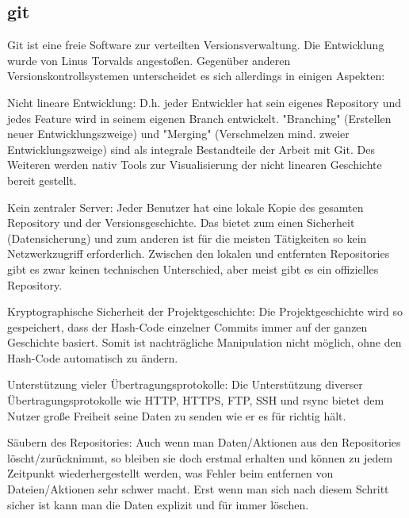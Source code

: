 \subsection{git}
Git ist eine freie Software zur verteilten Versionsverwaltung. Die Entwicklung wurde von Linus Torvalds angestoßen. Gegenüber anderen Versionskontrollsystemen unterscheidet es sich allerdings in einigen Aspekten:

\noindent Nicht lineare Entwicklung:
D.h. jeder Entwickler hat sein eigenes Repository und jedes Feature wird in seinem eigenen Branch entwickelt. "Branching" (Erstellen neuer Entwicklungszweige) und "Merging" (Verschmelzen mind. zweier Entwicklungszweige) sind als integrale Bestandteile der Arbeit mit Git. Des Weiteren werden nativ Tools zur Visualisierung der nicht linearen Geschichte bereit gestellt.

\noindent Kein zentraler Server:
Jeder Benutzer hat eine lokale Kopie des gesamten Repository und der Versionsgeschichte. Das bietet zum einen Sicherheit (Datensicherung) und zum anderen ist für die meisten Tätigkeiten so kein Netzwerkzugriff erforderlich. Zwischen den lokalen und entfernten Repositories gibt es zwar keinen technischen Unterschied, aber meist gibt es ein offizielles Repository.

\noindent Kryptographische Sicherheit der Projektgeschichte:
Die Projektgeschichte wird so gespeichert, dass der Hash-Code einzelner Commits immer auf der ganzen Geschichte basiert. Somit ist nachträgliche Manipulation nicht möglich, ohne den Hash-Code automatisch zu ändern.

\noindent Unterstützung vieler Übertragungsprotokolle:
Die Unterstützung diverser Übertragungsprotokolle wie HTTP, HTTPS, FTP, SSH und rsync bietet dem Nutzer große Freiheit seine Daten zu senden wie er es für richtig hält.

\noindent Säubern des Repositories:
Auch wenn man Daten/Aktionen aus den Repositories löscht/zurücknimmt, so bleiben sie doch erstmal erhalten und können zu jedem Zeitpunkt wiederhergestellt werden, was Fehler beim entfernen von Dateien/Aktionen sehr schwer macht. Erst wenn man sich nach diesem Schritt sicher ist kann man die Daten explizit und für immer löschen.
\cite{gitwiki}	
